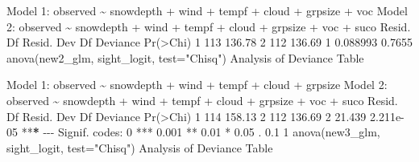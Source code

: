 \documentclass[
]{article}
\newenvironment{Shaded}{\begin{snugshade}}{\end{snugshade}}
\newcommand{\AttributeTok}[1]{\textcolor[rgb]{0.77,0.63,0.00}{#1}}
\newcommand{\DecValTok}[1]{\textcolor[rgb]{0.00,0.00,0.81}{#1}}
\newcommand{\ErrorTok}[1]{\textcolor[rgb]{0.64,0.00,0.00}{\textbf{#1}}}
\newcommand{\FloatTok}[1]{\textcolor[rgb]{0.00,0.00,0.81}{#1}}
\newcommand{\FunctionTok}[1]{\textcolor[rgb]{0.00,0.00,0.00}{#1}}
\newcommand{\NormalTok}[1]{#1}
\newcommand{\SpecialCharTok}[1]{\textcolor[rgb]{0.00,0.00,0.00}{#1}}
\newcommand{\StringTok}[1]{\textcolor[rgb]{0.31,0.60,0.02}{#1}}
\begin{document}
\begin{Shaded}
\begin{Highlighting}[]
\NormalTok{Model }\DecValTok{1}\SpecialCharTok{:}\NormalTok{ observed }\SpecialCharTok{\textasciitilde{}}\NormalTok{ snowdepth }\SpecialCharTok{+}\NormalTok{ wind }\SpecialCharTok{+}\NormalTok{ tempf }\SpecialCharTok{+}\NormalTok{ cloud }\SpecialCharTok{+}\NormalTok{ grpsize }\SpecialCharTok{+}\NormalTok{ voc}
\NormalTok{Model }\DecValTok{2}\SpecialCharTok{:}\NormalTok{ observed }\SpecialCharTok{\textasciitilde{}}\NormalTok{ snowdepth }\SpecialCharTok{+}\NormalTok{ wind }\SpecialCharTok{+}\NormalTok{ tempf }\SpecialCharTok{+}\NormalTok{ cloud }\SpecialCharTok{+}\NormalTok{ grpsize }\SpecialCharTok{+}\NormalTok{ voc }\SpecialCharTok{+} 
\NormalTok{    suco}
\NormalTok{  Resid. Df Resid. Dev Df Deviance }\FunctionTok{Pr}\NormalTok{(}\SpecialCharTok{\textgreater{}}\NormalTok{Chi)}
\DecValTok{1}       \DecValTok{113}     \FloatTok{136.78}                     
\DecValTok{2}       \DecValTok{112}     \FloatTok{136.69}  \DecValTok{1} \FloatTok{0.088993}   \FloatTok{0.7655}
\FunctionTok{anova}\NormalTok{(new2\_glm, sight\_logit, }\AttributeTok{test=}\StringTok{"Chisq"}\NormalTok{)}
\NormalTok{Analysis of Deviance Table}

\NormalTok{Model }\DecValTok{1}\SpecialCharTok{:}\NormalTok{ observed }\SpecialCharTok{\textasciitilde{}}\NormalTok{ snowdepth }\SpecialCharTok{+}\NormalTok{ wind }\SpecialCharTok{+}\NormalTok{ tempf }\SpecialCharTok{+}\NormalTok{ cloud }\SpecialCharTok{+}\NormalTok{ grpsize}
\NormalTok{Model }\DecValTok{2}\SpecialCharTok{:}\NormalTok{ observed }\SpecialCharTok{\textasciitilde{}}\NormalTok{ snowdepth }\SpecialCharTok{+}\NormalTok{ wind }\SpecialCharTok{+}\NormalTok{ tempf }\SpecialCharTok{+}\NormalTok{ cloud }\SpecialCharTok{+}\NormalTok{ grpsize }\SpecialCharTok{+}\NormalTok{ voc }\SpecialCharTok{+} 
\NormalTok{    suco}
\NormalTok{  Resid. Df Resid. Dev Df Deviance  }\FunctionTok{Pr}\NormalTok{(}\SpecialCharTok{\textgreater{}}\NormalTok{Chi)    }
\DecValTok{1}       \DecValTok{114}     \FloatTok{158.13}                          
\DecValTok{2}       \DecValTok{112}     \FloatTok{136.69}  \DecValTok{2}   \FloatTok{21.439} \FloatTok{2.211e{-}05} \SpecialCharTok{**}\ErrorTok{*}
\SpecialCharTok{{-}{-}{-}}
\NormalTok{Signif. codes}\SpecialCharTok{:}  \DecValTok{0} \StringTok{\textquotesingle{}***\textquotesingle{}} \FloatTok{0.001} \StringTok{\textquotesingle{}**\textquotesingle{}} \FloatTok{0.01} \StringTok{\textquotesingle{}*\textquotesingle{}} \FloatTok{0.05} \StringTok{\textquotesingle{}.\textquotesingle{}} \FloatTok{0.1} \StringTok{\textquotesingle{} \textquotesingle{}} \DecValTok{1}
\FunctionTok{anova}\NormalTok{(new3\_glm, sight\_logit, }\AttributeTok{test=}\StringTok{"Chisq"}\NormalTok{)}
\NormalTok{Analysis of Deviance Table}


\end{Highlighting}
\end{Shaded}
\end{document}
